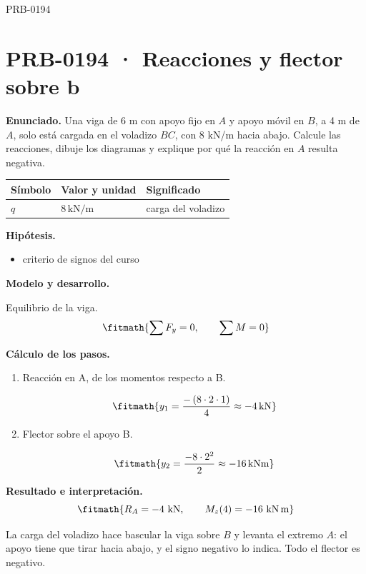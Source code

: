 \begin{studiumworked}{PRB-0194}

\section{PRB-0194 · Reacciones y flector sobre b}

\textbf{Enunciado.} Una viga de 6 m con apoyo fijo en $A$ y apoyo móvil en $B$, a 4 m de $A$, solo está cargada en el voladizo $BC$, con 8 kN/m hacia abajo. Calcule las reacciones, dibuje los diagramas y explique por qué la reacción en $A$ resulta negativa.

\par\medskip\noindent\begin{tabular}{@{}p{.18\linewidth}p{.26\linewidth}p{.48\linewidth}@{}}
\toprule Símbolo & Valor y unidad & Significado\\\midrule
$q$ & $8\,\mathrm{kN/m}$ & carga del voladizo\\
\bottomrule\end{tabular}\par\medskip

\textbf{Hipótesis.}\begin{itemize}\item criterio de signos del curso\end{itemize}

\textbf{Modelo y desarrollo.}

Equilibrio de la viga.\[\fitmath{\sum F_y = 0,\qquad \sum M = 0}\]

\textbf{Cálculo de los pasos.}

\begin{enumerate}

\item Reacción en A, de los momentos respecto a B.

\[\fitmath{y_{1}=\frac{-\left(8\cdot 2\cdot 1\right)}{4}\approx -4\,\mathrm{kN}}\]

\item Flector sobre el apoyo B.

\[\fitmath{y_{2}=\frac{-8\cdot {2}^{2}}{2}\approx -16\,\mathrm{kN m}}\]

\end{enumerate}

\textbf{Resultado e interpretación.}\[\fitmath{R_A = -4\ \mathrm{kN},\qquad M_z(4) = -16\ \mathrm{kN\,m}}\]

La carga del voladizo hace bascular la viga sobre $B$ y levanta el extremo $A$: el apoyo tiene que tirar hacia abajo, y el signo negativo lo indica. Todo el flector es negativo.


\end{studiumworked}
